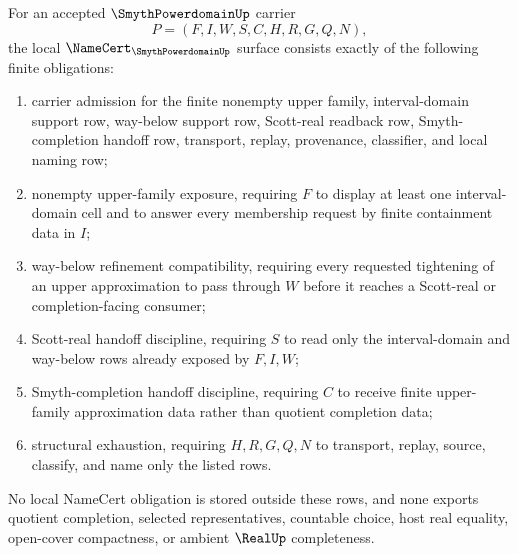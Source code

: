 \begin{theorem}
\label{thm:smyth-powerdomain-namecert-obligations}
For an accepted $\SmythPowerdomainUp$ carrier
$$
P=(F,I,W,S,C,H,R,G,Q,N),
$$
the local $\NameCert_{\SmythPowerdomainUp}$ surface consists exactly of the following finite obligations:
\begin{enumerate}
\item carrier admission for the finite nonempty upper family, interval-domain support row, way-below support row, Scott-real readback row, Smyth-completion handoff row, transport, replay, provenance, classifier, and local naming row;
\item nonempty upper-family exposure, requiring $F$ to display at least one interval-domain cell and to answer every membership request by finite containment data in $I$;
\item way-below refinement compatibility, requiring every requested tightening of an upper approximation to pass through $W$ before it reaches a Scott-real or completion-facing consumer;
\item Scott-real handoff discipline, requiring $S$ to read only the interval-domain and way-below rows already exposed by $F,I,W$;
\item Smyth-completion handoff discipline, requiring $C$ to receive finite upper-family approximation data rather than quotient completion data;
\item structural exhaustion, requiring $H,R,G,Q,N$ to transport, replay, source, classify, and name only the listed rows.
\end{enumerate}
No local NameCert obligation is stored outside these rows, and none exports quotient completion, selected representatives, countable choice, host real equality, open-cover compactness, or ambient $\RealUp$ completeness.
\end{theorem}
